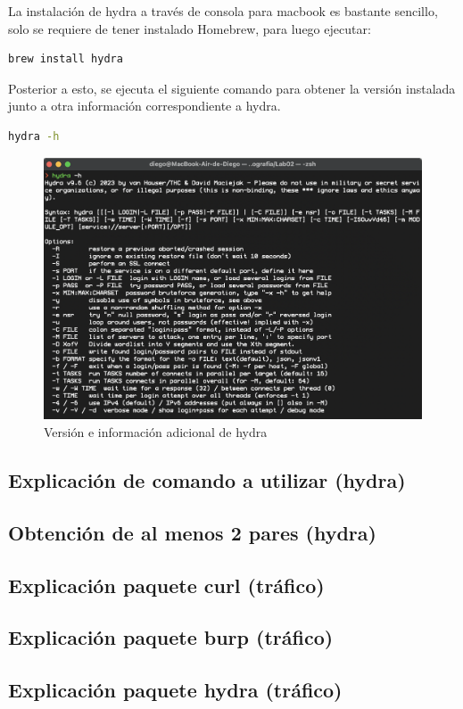 \documentclass[letter,12pt]{article}
\begin{document}
La instalación de hydra a través de consola para macbook es bastante sencillo, solo se requiere de tener instalado Homebrew, para luego ejecutar:
\begin{lstlisting}[language=bash, caption={Instalación de hydra}]
brew install hydra
\end{lstlisting}
Posterior a esto, se ejecuta el siguiente comando para obtener la versión instalada junto a otra información correspondiente a hydra.
\begin{lstlisting}[language=bash, caption={Versión de hydra}]
hydra -h
\end{lstlisting}
\begin{figure}[H]
    \centering
    \includegraphics[width=0.5\linewidth]{Imagenes/hydra_version.png}
    \caption{Versión e información adicional de hydra}
    \label{fig:placeholder}
\end{figure}

\subsection{Explicación de comando a utilizar (hydra)}

\subsection{Obtención de al menos 2 pares (hydra)}

\subsection{Explicación paquete curl (tráfico)}

\subsection{Explicación paquete burp (tráfico)}

\subsection{Explicación paquete hydra (tráfico)}
\end{document}
